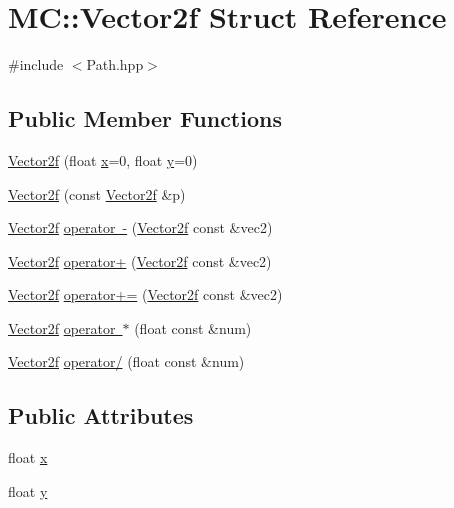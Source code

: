\hypertarget{struct_m_c_1_1_vector2f}{}\section{MC\+::Vector2f Struct Reference}
\label{struct_m_c_1_1_vector2f}


{\ttfamily \#include $<$Path.\+hpp$>$}

\subsection*{Public Member Functions}
\begin{DoxyCompactItemize}
\item 
\mbox{\hyperlink{struct_m_c_1_1_vector2f_a19571a08e37590141d2aa54a76e8d32c}{Vector2f}} (float \mbox{\hyperlink{struct_m_c_1_1_vector2f_ab37720a2995f00ff0d75adf20241f845}{x}}=0, float \mbox{\hyperlink{struct_m_c_1_1_vector2f_ab380af0c672ec08930ea4b8edc800239}{y}}=0)
\item 
\mbox{\hyperlink{struct_m_c_1_1_vector2f_a79b2c4c246a3385c77cef85aa193c4c3}{Vector2f}} (const \mbox{\hyperlink{struct_m_c_1_1_vector2f}{Vector2f}} \&p)
\item 
\mbox{\hyperlink{struct_m_c_1_1_vector2f}{Vector2f}} \mbox{\hyperlink{struct_m_c_1_1_vector2f_a5075657a1f5ec3e47f3ea19c10e6718e}{operator -\/}} (\mbox{\hyperlink{struct_m_c_1_1_vector2f}{Vector2f}} const \&vec2)
\item 
\mbox{\hyperlink{struct_m_c_1_1_vector2f}{Vector2f}} \mbox{\hyperlink{struct_m_c_1_1_vector2f_a428501356ff26bfee72d1e5f39c3364e}{operator+}} (\mbox{\hyperlink{struct_m_c_1_1_vector2f}{Vector2f}} const \&vec2)
\item 
\mbox{\hyperlink{struct_m_c_1_1_vector2f}{Vector2f}} \mbox{\hyperlink{struct_m_c_1_1_vector2f_a25b7fb78549176e548b85fcc4a4f9a31}{operator+=}} (\mbox{\hyperlink{struct_m_c_1_1_vector2f}{Vector2f}} const \&vec2)
\item 
\mbox{\hyperlink{struct_m_c_1_1_vector2f}{Vector2f}} \mbox{\hyperlink{struct_m_c_1_1_vector2f_ad682cf2b9935e45a76caf206a5eabd41}{operator $\ast$}} (float const \&num)
\item 
\mbox{\hyperlink{struct_m_c_1_1_vector2f}{Vector2f}} \mbox{\hyperlink{struct_m_c_1_1_vector2f_aaae7fdbf4fbee90d7b474cb30c09f4b9}{operator/}} (float const \&num)
\end{DoxyCompactItemize}
\subsection*{Public Attributes}
\begin{DoxyCompactItemize}
\item 
float \mbox{\hyperlink{struct_m_c_1_1_vector2f_ab37720a2995f00ff0d75adf20241f845}{x}}
\item 
float \mbox{\hyperlink{struct_m_c_1_1_vector2f_ab380af0c672ec08930ea4b8edc800239}{y}}
\end{DoxyCompactItemize}


